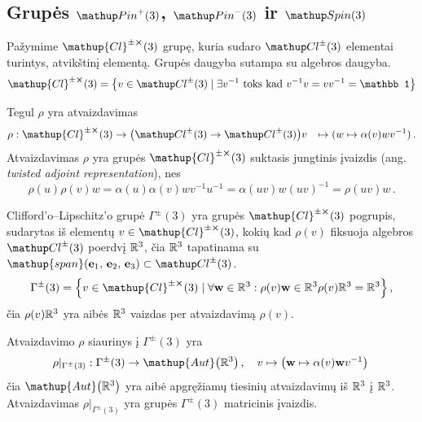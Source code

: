 
\subsection{Grupės \texorpdfstring{$\pinp$}{Pin+(3)}, \texorpdfstring{$\pinm$}{Pin-(3)} ir \texorpdfstring{$\spin$}{Spin(3)}}

Pažymime $\mathup{Cl}^{\pm\cross}(3)$ grupę,
kuria sudaro $\Clpm$ elementai turintys, atvikštinį elementą.
Grupės daugyba sutampa su algebros daugyba. 
\begin{equation}
	\mathup{Cl}^{\pm\cross}(3)
	= \qty{
		v \in \Clpm
		\mid
		\exists v^{-1}
		\text{ toks kad }
		v^{-1}v = vv^{-1} = \mathbb1
	} 
\end{equation}

\begin{definition}
	Tegul $\rho$ yra atvaizdavimas
	\begin{equation}
		\begin{aligned}
			\rho: \mathup{Cl}^{\pm\cross}(3) &\to \qty( \Clpm \to \Clpm )
			v &\mapsto (w \mapsto \alpha(v) w v^{-1})
			\,.
		\end{aligned}
	\end{equation}
	Atvaizdavimas $\rho$ yra grupės $\mathup{Cl}^{\pm\cross}(3)$
	suktasis jungtinis įvaizdis (ang. \emph{twisted adjoint representation}),
	nes
	\begin{equation}
		\rho(u)\rho(v)w 
		= \alpha(u)\alpha(v)wv^{-1}u^{-1}
		= \alpha(uv)w(uv)^{-1}
		= \rho(uv)w
		\,.
	\end{equation}
\end{definition}

\begin{definition}
	Clifford'o–Lipschitz'o grupė $\Gamma^\pm(3)$ yra grupės
	$\mathup{Cl}^{\pm\cross}(3)$ pogrupis,
	sudarytas iš elementų $v \in \mathup{Cl}^{\pm\cross}(3)$,
	kokių kad $\rho(v)$ fiksuoja algebros $\Clpm$ poerdvį $\mathbb{R}^3$,
	čia $\mathbb{R}^3$ tapatinama su
	$\mathup{span}(\vb e_1,\,\vb e_2,\,\vb e_3) \subset \Clpm$.
	\begin{equation}
		\Gamma^\pm(3) = \qty{
			v \in \mathup{Cl}^{\pm\cross}(3)
			\mid
			\forall \vb w \in \set R^3 : \rho(v) \vb w \in \set R^3  
			\rho(v) \set R^3 = \set R^3  
		}
		\,,
	\end{equation}
	čia $\rho(v) \mathbb{R}^3$ yra aibės $\mathbb{R}^3$ vaizdas per atvaizdavimą $\rho(v)$.
\end{definition}

\begin{remark}
	Atvaizdavimo $\rho$ siaurinys į $\Gamma^\pm(3)$ yra
	\begin{equation}
		\rho |_{\Gamma^\pm(3)} : \Gamma^\pm(3) \to \mathup{Aut}\qty(\set R^3)
		\,,\quad
		v \mapsto \qty(\vb w \mapsto \alpha(v) \vb w v^{-1})
		\,
	\end{equation}
	čia $\mathup{Aut}\qty(\set R^3)$
	yra aibė apgręžiamų tiesinių atvaizdavimų iš $\mathbb{R}^3$ į $\mathbb{R}^3$.
	Atvaizdavimas $\rho |_{\Gamma^\pm(3)}$
	yra grupės $\Gamma^\pm(3)$ matricinis įvaizdis.
\end{remark}

